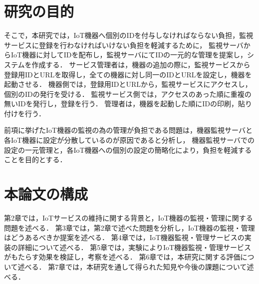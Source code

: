 \section{研究の目的}
そこで，本研究では，IoT機器へ個別のIDを付与しなければならない負担，監視サービスに登録を行わなければいけない負担を軽減するために，
監視サーバからIoT機器に対してIDを配布し，監視サーバにてIDの一元的な管理を提案し，システムを作成する．
サービス管理者は，機器の追加の際に，監視サービスから登録用IDとURLを取得し，全ての機器に対し同一のIDとURLを設定し，機器を起動させる．
機器側では，登録用IDとURLから，監視サービスにアクセスし，個別のIDの発行を受ける．
監視サービス側では，アクセスのあった順に重複の無いIDを発行し，登録を行う．
管理者は，機器を起動した順にIDの印刷，貼り付けを行う．
\medskip

前項に挙げたIoT機器の監視の為の管理が負担である問題は，機器監視サーバと各IoT機器に設定が分散しているのが原因であると分析し，
機器監視サーバでの設定の一元管理と，各IoT機器への個別の設定の簡略化により，負担を軽減することを目的とする．

\section{本論文の構成}
第2章では，IoTサービスの維持に関する背景と，IoT機器の監視・管理に関する問題を述べる．
第3章では，第2章で述べた問題を分析し，IoT機器の監視・管理はどうあるべきか提案を述べる．
第4章では，IoT機器監視・管理サービスの実装の詳細について述べる．
第5章では，実験によりIoT機器監視・管理サービスがもたらす効果を検証し，考察を述べる．
第6章では，本研究に関する評価について述べる．
第7章では，本研究を通して得られた知見や今後の課題について述べる．


